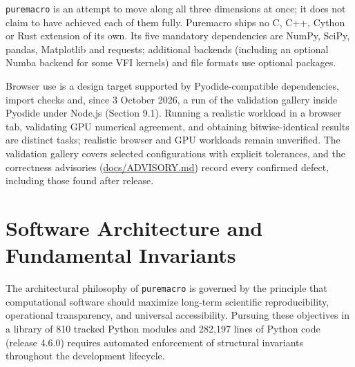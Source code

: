 \documentclass[11pt,letterpaper]{article}
\renewcommand{\_}{\pmunderscore\allowbreak}
\begin{document}
\texttt{puremacro} is an attempt to move along all three dimensions at once; it does not claim to have achieved each of them fully. Puremacro ships no C, C++, Cython or Rust extension of its own. Its five mandatory dependencies are NumPy, SciPy, pandas, Matplotlib and requests; additional backends (including an optional Numba backend for some VFI kernels) and file formats use optional packages.

Browser use is a design target supported by Pyodide-compatible dependencies, import checks and, since 3 October 2026, a run of the validation gallery inside Pyodide under Node.js (Section 9.1). Running a realistic workload in a browser tab, validating GPU numerical agreement, and obtaining bitwise-identical results are distinct tasks; realistic browser and GPU workloads remain unverified. The validation gallery covers selected configurations with explicit tolerances, and the correctness advisories (\href{https://github.com/jalonso1979/puremacro/blob/v4.6.0/docs/ADVISORY.md}{docs/ADVISORY.md}) record every confirmed defect, including those found after release.

\section{Software Architecture and Fundamental Invariants}\label{software-architecture-and-fundamental-invariants}

The architectural philosophy of \texttt{puremacro} is governed by the principle that computational software should maximize long-term scientific reproducibility, operational transparency, and universal accessibility. Pursuing these objectives in a library of 810 tracked Python modules and 282,197 lines of Python code (release 4.6.0) requires automated enforcement of structural invariants throughout the development lifecycle.
\end{document}
